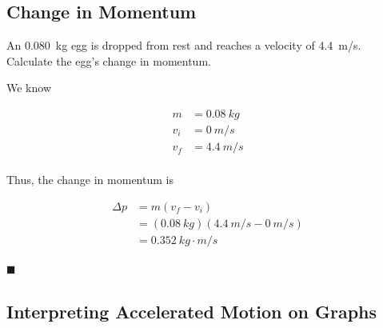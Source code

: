 \documentclass[]{exam}
\begin{document}
\clearpage

\subsection*{Change in Momentum}

\begin{questions}
\question
An \SI{0.080}{kg} egg is dropped from rest and reaches a velocity of \SI{4.4}{m/s}. Calculate the egg's change in momentum.

\begin{solution}
We know

\vspace{-1em}
\begin{align*}
    m &= \SI{0.08}{kg} \\[1ex]
    v_i &= \SI{0}{m/s} \\[1ex]
    v_f &= \SI{4.4}{m/s} \\[1ex]
\end{align*}

Thus, the change in momentum is

\vspace{-1em}
\begin{align*}
    \Delta p &= m (v_f - v_i) \\[1ex]
    &= (\SI{0.08}{kg})(\SI{4.4}{m/s} - \SI{0}{m/s}) \\[1ex]
    &= \boxed{\SI{0.352}{kg\cdot m/s}}
\end{align*}

\hfill $\blacksquare$
\end{solution}


\end{questions}

\clearpage

\subsection*{Interpreting Accelerated Motion on Graphs}
\end{document}
